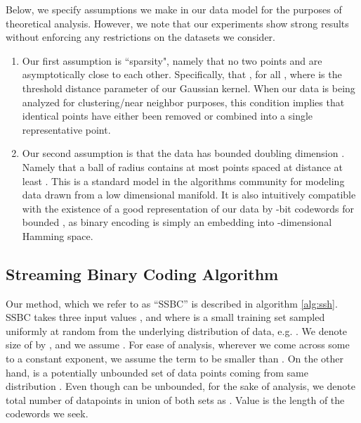 \documentclass{sig-alternate}
\begin{document}
Below, we specify assumptions we make in our data model for the purposes of theoretical analysis. However, we note that our experiments show strong results without enforcing any restrictions on the datasets we consider.

\begin{enumerate}
\item{Our first assumption is ``sparsity", namely that no two points  and  are asymptotically close to each other. Specifically, that , for all , where  is the threshold distance parameter of our Gaussian kernel. When our data is being analyzed for clustering/near neighbor purposes, this condition implies that identical points have either been removed or combined into a single representative point.}
\item{Our second assumption is that the data has bounded doubling dimension . Namely that a ball  of radius  contains at most  points spaced at distance at least . This is a standard model in the algorithms community for modeling data drawn from a low dimensional manifold. It is also intuitively compatible with the existence of a good representation of our data by -bit codewords for bounded , as binary encoding is simply an embedding into -dimensional Hamming space.}
\end{enumerate}


\subsection{Streaming Binary Coding Algorithm}
Our method, which we refer to as ``SSBC'' is described in algorithm \ref{alg:ssh}.
SSBC takes three input values ,  and  where  is a small training set sampled uniformly at random from the underlying distribution of data, e.g. . We denote size of  by , and we assume . For ease of analysis, wherever we come across some  to a constant exponent, we assume the term to be smaller than .
On the other hand,  is a potentially unbounded set of data points coming from same distribution . Even though  can be unbounded, for the sake of analysis, we denote total number of datapoints in union of both sets as .
Value  is the length of the codewords we seek.
\end{document}
